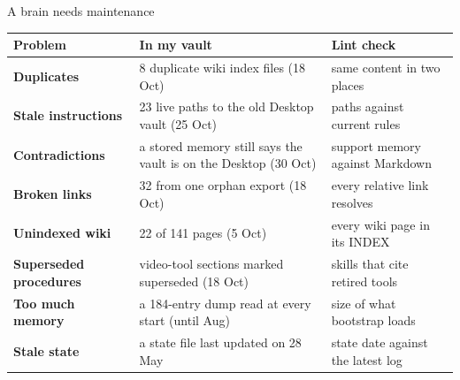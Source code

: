 \begin{frame}{A brain needs maintenance}
  \renewcommand{\arraystretch}{1.08}
  {\scriptsize
  \begin{tabularx}{\linewidth}{>{\bfseries\color{ink}}l >{\leavevmode\color{dark}}X l}
  \toprule
  Problem & In my vault & Lint check\\
  \midrule
  Duplicates & 8 duplicate wiki index files (18 Oct) & same content in two places\\
  Stale instructions & 23 live paths to the old Desktop vault (25 Oct) & paths against current rules\\
  Contradictions & a stored memory still says the vault is on the Desktop (30 Oct) & support memory against Markdown\\
  Broken links & 32 from one orphan export (18 Oct) & every relative link resolves\\
  Unindexed wiki & 22 of 141 pages (5 Oct) & every wiki page in its INDEX\\
  Superseded procedures & video-tool sections marked superseded (18 Oct) & skills that cite retired tools\\
  Too much memory & a 184-entry dump read at every start (until Aug) & size of what bootstrap loads\\
  Stale state & a state file last updated on 28 May & state date against the latest log\\
  \bottomrule
  \end{tabularx}}
\end{frame}

